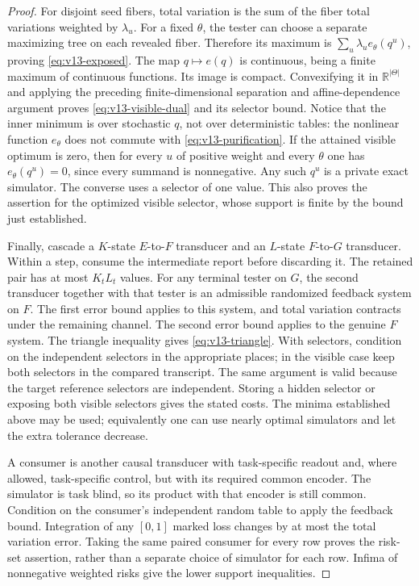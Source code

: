\begin{proof}
For disjoint seed fibers, total variation is the sum of the fiber total
variations weighted by $\lambda_u$. For a fixed $\theta$, the tester can
choose a separate maximizing tree on each revealed fiber. Therefore
its maximum is $\sum_u\lambda_ue_\theta(q^u)$, proving
\eqref{eq:v13-exposed}. The map $q\mapsto e(q)$ is continuous, being a
finite maximum of continuous functions. Its image is compact. Convexifying
it in $\mathbb R^{|\Theta|}$ and applying the preceding finite-dimensional
separation and affine-dependence argument proves
\eqref{eq:v13-visible-dual} and its selector bound. Notice that the inner
minimum is over stochastic $q$, not over deterministic tables: the
nonlinear function $e_\theta$ does not commute with
\eqref{eq:v13-purification}. If the attained visible optimum is zero,
then for every $u$ of positive weight and every $\theta$ one has
$e_\theta(q^u)=0$, since every summand is nonnegative. Any such $q^u$
is a private exact simulator. The converse uses a selector of one value.
This also proves the assertion for the optimized visible selector,
whose support is finite by the bound just established.

Finally, cascade a $K$-state $E$-to-$F$ transducer and an $L$-state
$F$-to-$G$ transducer. Within a step, consume the intermediate report
before discarding it. The retained pair has at most $K_tL_t$ values.
For any terminal tester on $G$, the second transducer together with
that tester is an admissible randomized feedback system on $F$.
The first error bound applies to this system, and total variation
contracts under the remaining channel. The second error bound applies
to the genuine $F$ system. The triangle inequality gives
\eqref{eq:v13-triangle}. With selectors, condition on the independent
selectors in the appropriate places; in the visible case keep both
selectors in the compared transcript. The same argument is valid
because the target reference selectors are independent. Storing a
hidden selector or exposing both visible selectors gives the stated
costs. The minima established above may be used; equivalently one can
use nearly optimal simulators and let the extra tolerance decrease.

A consumer is another causal transducer with task-specific readout and,
where allowed, task-specific control, but with its required common
encoder. The simulator is task blind, so its product with that encoder
is still common. Condition on the consumer's independent random table
to apply the feedback bound. Integration of any $[0,1]$ marked loss
changes by at most the total variation error. Taking the same paired
consumer for every row proves the risk-set assertion, rather than a
separate choice of simulator for each row. Infima of nonnegative
weighted risks give the lower support inequalities.
\end{proof}

